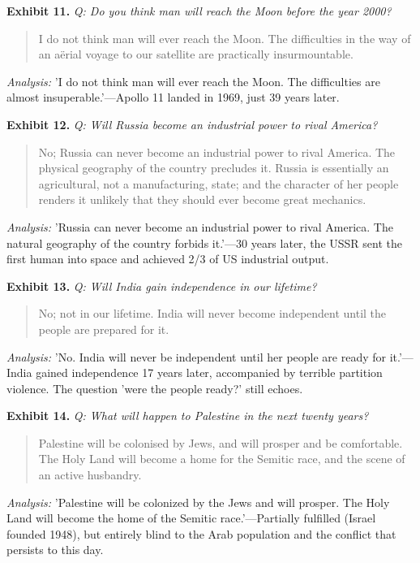 \documentclass[11pt]{article}
\begin{document}
\noindent\textbf{Exhibit 11.} \textit{Q: Do you think man will reach the Moon before the year 2000?}

\begin{quote}
\small I do not think man will ever reach the Moon. The difficulties in the way of an aërial voyage to our satellite are practically insurmountable.
\end{quote}
\noindent\textit{Analysis:} 'I do not think man will ever reach the Moon. The difficulties are almost insuperable.'---Apollo 11 landed in 1969, just 39 years later.

\noindent\textbf{Exhibit 12.} \textit{Q: Will Russia become an industrial power to rival America?}

\begin{quote}
\small No; Russia can never become an industrial power to rival America. The physical geography of the country precludes it. Russia is essentially an agricultural, not a manufacturing, state; and the character of her people renders it unlikely that they should ever become great mechanics.
\end{quote}
\noindent\textit{Analysis:} 'Russia can never become an industrial power to rival America. The natural geography of the country forbids it.'---30 years later, the USSR sent the first human into space and achieved 2/3 of US industrial output.

\noindent\textbf{Exhibit 13.} \textit{Q: Will India gain independence in our lifetime?}

\begin{quote}
\small No; not in our lifetime. India will never become independent until the people are prepared for it.
\end{quote}
\noindent\textit{Analysis:} 'No. India will never be independent until her people are ready for it.'---India gained independence 17 years later, accompanied by terrible partition violence. The question 'were the people ready?' still echoes.

\noindent\textbf{Exhibit 14.} \textit{Q: What will happen to Palestine in the next twenty years?}

\begin{quote}
\small Palestine will be colonised by Jews, and will prosper and be comfortable. The Holy Land will become a home for the Semitic race, and the scene of an active husbandry.
\end{quote}
\noindent\textit{Analysis:} 'Palestine will be colonized by the Jews and will prosper. The Holy Land will become the home of the Semitic race.'---Partially fulfilled (Israel founded 1948), but entirely blind to the Arab population and the conflict that persists to this day.
\end{document}
